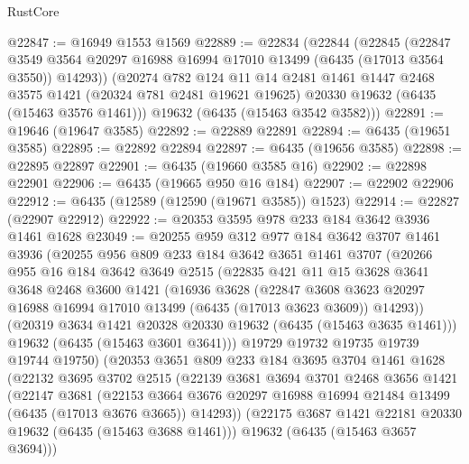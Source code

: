 \begin{lexlean}{RustCore}
\begin{coremodule}
@22847 := @16949 @1553 @1569
@22889 := @22834
    (@22844
      (@22845
        (@22847 @3549 @3564 @20297 @16988 @16994 @17010 @13499 (@6435 (@17013 @3564 @3550)) @14293))
      (@20274
        @782
        @124
        @11
        @14
        @2481
        @1461
        @1447
        @2468
        @3575
        @1421
        (@20324 @781 @2481 @19621 @19625)
        @20330
        @19632
        (@6435 (@15463 @3576 @1461)))
      @19632
      (@6435 (@15463 @3542 @3582)))
@22891 := @19646 (@19647 @3585)
@22892 := @22889 @22891
@22894 := @6435 (@19651 @3585)
@22895 := @22892 @22894
@22897 := @6435 (@19656 @3585)
@22898 := @22895 @22897
@22901 := @6435 (@19660 @3585 @16)
@22902 := @22898 @22901
@22906 := @6435 (@19665 @950 @16 @184)
@22907 := @22902 @22906
@22912 := @6435 (@12589 (@12590 (@19671 @3585)) @1523)
@22914 := @22827 (@22907 @22912)
@22922 := @20353 @3595 @978 @233 @184 @3642 @3936 @1461 @1628
@23049 := @20255
    @959
    @312
    @977
    @184
    @3642
    @3707
    @1461
    @3936
    (@20255
      @956
      @809
      @233
      @184
      @3642
      @3651
      @1461
      @3707
      (@20266
        @955
        @16
        @184
        @3642
        @3649
        @2515
        (@22835
          @421
          @11
          @15
          @3628
          @3641
          @3648
          @2468
          @3600
          @1421
          (@16936
            @3628
            (@22847
              @3608
              @3623
              @20297
              @16988
              @16994
              @17010
              @13499
              (@6435 (@17013 @3623 @3609))
              @14293))
          (@20319 @3634 @1421 @20328 @20330 @19632 (@6435 (@15463 @3635 @1461)))
          @19632
          (@6435 (@15463 @3601 @3641)))
        @19729
        @19732
        @19735
        @19739
        @19744
        @19750)
      (@20353
        @3651
        @809
        @233
        @184
        @3695
        @3704
        @1461
        @1628
        (@22132
          @3695
          @3702
          @2515
          (@22139
            @3681
            @3694
            @3701
            @2468
            @3656
            @1421
            (@22147
              @3681
              (@22153
                @3664
                @3676
                @20297
                @16988
                @16994
                @21484
                @13499
                (@6435 (@17013 @3676 @3665))
                @14293))
            (@22175 @3687 @1421 @22181 @20330 @19632 (@6435 (@15463 @3688 @1461)))
            @19632
            (@6435 (@15463 @3657 @3694)))

\end{coremodule}
\end{lexlean}
